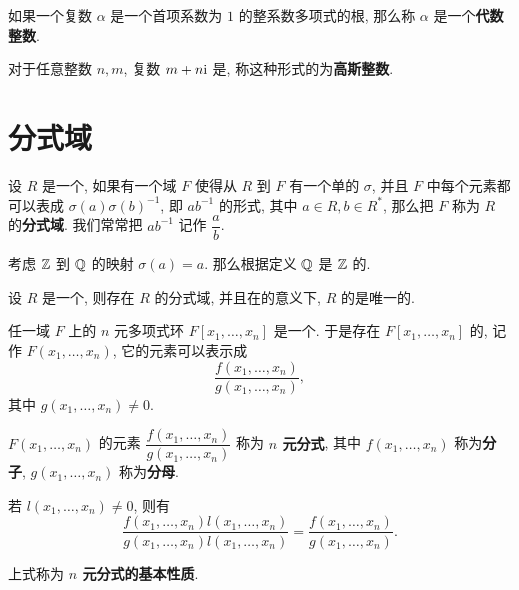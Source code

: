 \begin{definition}\label{代数整数}
	如果一个复数 $\alpha$ 是一个首项系数为 $1$ 的整系数多项式的根, 那么称 $\alpha$ 是一个\textbf{代数整数}.
\end{definition}

\begin{definition}\label{高斯整数}
	对于任意整数 $n,m$, 复数 $m+n\text {i}$ 是, 称这种形式的为\textbf{高斯整数}.
\end{definition}

\section{分式域}

\begin{definition}\label{分式域}
	设 $R$ 是一个, 如果有一个域 $F$ 使得从 $R$ 到 $F$ 有一个单的 $\sigma$, 并且 $F$ 中每个元素都可以表成 $\sigma(a)\sigma(b)^{-1}$, 即 $ab^{-1}$ 的形式, 其中 $a\in R,b\in R^*$, 那么把 $F$ 称为 $R$ 的\textbf{分式域}. 我们常常把 $ab^{-1}$ 记作 $\dfrac{a}{b}$.
\end{definition}

\begin{example}
	考虑 $\mathbb Z$ 到 $\mathbb Q$ 的映射 $\sigma(a)=a$. 那么根据定义 $\mathbb Q$ 是 $\mathbb Z$ 的.
\end{example}

\begin{theorem}
	设 $R$ 是一个, 则存在 $R$ 的分式域, 并且在的意义下, $R$ 的是唯一的.
\end{theorem}

任一域 $F$ 上的 $n$ 元多项式环 $F[x_1,\ldots,x_n]$ 是一个. 于是存在 $F[x_1,\ldots,x_n]$ 的, 记作 $F(x_1,\ldots,x_n)$, 它的元素可以表示成 $$\frac{f(x_1,\ldots,x_n)}{g(x_1,\ldots,x_n)},$$ 其中 $g(x_1,\ldots,x_n)\neq 0$.

\begin{definition}
	$F(x_1,\ldots,x_n)$ 的元素 $\dfrac{f(x_1,\ldots,x_n)}{g(x_1,\ldots,x_n)}$ 称为 \textbf{$n$ 元分式}, 其中 $f(x_1,\ldots,x_n)$ 称为\textbf{分子}, $g(x_1,\ldots,x_n)$ 称为\textbf{分母}.

	若 $l(x_1,\ldots,x_n)\neq 0$, 则有
	\begin{equation}
		\frac{f(x_1,\ldots,x_n)l(x_1,\ldots,x_n)}{g(x_1,\ldots,x_n)l(x_1,\ldots,x_n)}=\frac{f(x_1,\ldots,x_n)}{g(x_1,\ldots,x_n)}.
	\end{equation}

	上式称为 \textbf{$n$ 元分式的基本性质}.
\end{definition}
